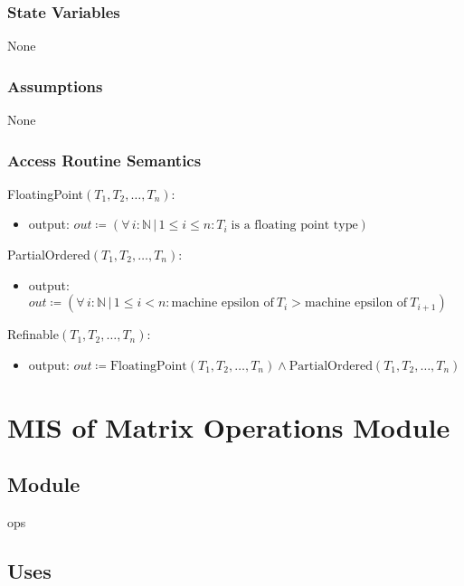 \documentclass[12pt, titlepage]{article}
\begin{document}
\subsubsection{State Variables}

None

\subsubsection{Assumptions}

None

\subsubsection{Access Routine Semantics}

\noindent FloatingPoint\((T_1, T_2, \dots, T_n)\):
\begin{itemize}
\item output: \(out \coloneq (\forall\,i : \mathbb{N}\,|\,1 \leq i \leq n : T_i\;\text{is a floating point type}) \)
\end{itemize}

\noindent PartialOrdered\((T_1, T_2, \dots, T_n)\):
\begin{itemize}
\item output: \(out \coloneq (\forall\,i : \mathbb{N}\,|\,1 \leq i < n : \text{machine epsilon of} \  T_i
  > \text{machine epsilon of} \  T_{i+1}) \)
\end{itemize}

\noindent Refinable\((T_1, T_2, \dots, T_n)\):
\begin{itemize}
\item output: \(out \coloneq \text{FloatingPoint}(T_1, T_2, \dots, T_n) \land \text{PartialOrdered}(T_1, T_2, \dots, T_n)\)
\end{itemize}

\newpage

\section{MIS of Matrix Operations Module} \label{M:ops}

\subsection{Module}

ops

\subsection{Uses}
\end{document}
